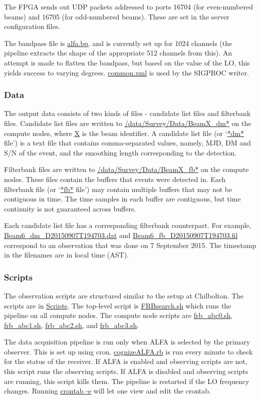 \documentclass{article}
\begin{document}
The FPGA sends out UDP packets addressed to ports 16704 (for even-numbered
beams) and 16705 (for odd-numbered beams). These are set in the server
configuration files.

The bandpass file is \url{alfa.bp}, and is currently set up for 1024 channels
(the pipeline extracts the shape of the appropriate 512 channels from this). An
attempt is made to flatten the bandpass, but based on the value of the LO, this
yields success to varying degrees. \url{common.xml} is used by the SIGPROC
writer.


\subsubsection{Data}

The output data consists of two kinds of files - candidate list files and
filterbank files. Candidate list files are written to
\url{/data/Survey/Data/BeamX_dm*} on the compute nodes, where \url{X} is the
beam identifier. A candidate list file (or `\url{*dm*} file') is a text file
that contains comma-separated values, namely, MJD, DM and S/N of the event, and
the smoothing length corresponding to the detection.

Filterbank files are written to \url{/data/Survey/Data/BeamX_fb*} on the
compute nodes. These files contain the buffers that events were detected in.
Each filterbank file (or `\url{*fb*} file') may contain multiple buffers that
may not be contiguous in time. The time samples in each buffer are contiguous,
but time continuity is not guaranteed across buffers.

Each candidate list file has a corresponding filterbank counterpart. For
example, \url{Beam6_dm_D20150907T194703.dat} and
\url{Beam6_fb_D20150907T194703.fil} correspond to an observation that was done
on 7 September 2015. The timestamp in the filenames are in local time (AST).


\subsubsection{Scripts}

The observation scripts are structured similar to the setup at Chilbolton. The
scripts are in \url{Scripts}. The top-level script is \url{FRBsearch.sh} which
runs the pipeline on all compute nodes. The compute node scripts are
\url{frb_abc0.sh}, \url{frb_abc1.sh}, \url{frb_abc2.sh}, and \url{frb_abc3.sh}.

The data acquisition pipeline is run only when ALFA is selected by the primary
observer. This is set up using cron. \url{cognizeALFA.rb} is run every minute
to check for the status of the receiver. If ALFA is enabled and observing
scripts are not, this script runs the observing scripts. If ALFA is disabled
and observing scripts are running, this script kills them. The pipeline is
restarted if the LO frequency changes. Running \url{crontab -e} will let one
view and edit the crontab.
\end{document}
